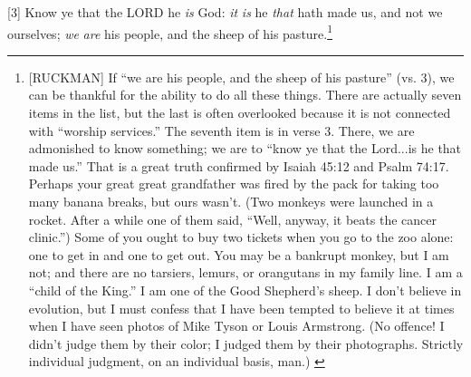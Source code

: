 [3] \textcolor[rgb]{0.00,0.00,1.00}{Know ye that the LORD he \emph{is} God: \emph{it} \emph{is} he \emph{that} hath made us, and not we ourselves; \emph{we} \emph{are} his people, and the sheep of his pasture.}\footnote{[RUCKMAN] If “we are his people, and the sheep of his
pasture” (vs. 3), we can be thankful for the
ability to do all these things. There are
actually seven items in the list, but the last is
often overlooked because it is not connected
with “worship services.” The seventh item is
in verse 3. There, we are admonished to
know something; we are to “know ye that
the Lord...is he that made us.” That is a
great truth confirmed by Isaiah 45:12 and
Psalm 74:17. Perhaps your
great great grandfather was fired by the pack
for taking too many banana breaks, but ours
wasn’t. (Two monkeys were launched in a
rocket. After a while one of them said, “Well,
anyway, it beats the cancer clinic.”)
Some of you ought to buy two tickets when
you go to the zoo alone: one to get in and one
to get out. You may be a bankrupt monkey,
but I am not; and there are no tarsiers,
lemurs, or orangutans in my family line. I am
a “child of the King.” I am one of the Good
Shepherd’s sheep. I don’t believe in
evolution, but I must confess that I have been
tempted to believe it at times when I have
seen photos of Mike Tyson or Louis
Armstrong. (No offence! I didn’t judge them
by their color; I judged them by their
photographs. Strictly individual judgment, on
an individual basis, man.) \cite{Ruckman1992Psalms}}
